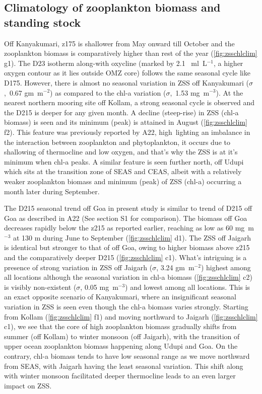 \documentclass[authoryear,review,12pt]{elsarticle}
\begin{document}
	\subsection{Climatology of zooplankton biomass and standing stock}
	\label{sec:climatology}
	Off Kanyakumari, z175 is shallower from May onward till October and the zooplankton biomass is comparatively higher than rest of the year (\cref{fig:zsschlclim} g1). The D23 isotherm along-with oxycline (marked by 2.1 ~ml~L$^{-1}$, a higher oxygen contour as it lies outside OMZ core) follows the same seasonal cycle like D175. However, there is almost no seasonal variation in ZSS off Kanyakumari ($\sigma$,~0.67 gm~m$^{-2}$) as compared to the chl-a variation ($\sigma$,~1.53 mg~m$^{-3}$). At the nearest northern mooring site off Kollam, a strong seasonal cycle is observed and the D215 is deeper for any given month. A decline (steep-rise) in ZSS (chl-a  biomass) is seen and its minimum (peak) is attained in August (\cref{fig:zsschlclim} f2). This feature was previously reported by A22, high~lighting an imbalance in the interaction between zooplankton and phytoplankton, it occurs due to shallowing of thermocline and low oxygen, and that's why the ZSS is at it's minimum when chl-a peaks. A similar feature is seen further north, off Udupi which sits at the transition zone of SEAS and CEAS, albeit with a relatively weaker zooplankton biomass and minimum (peak) of ZSS (chl-a) occurring a month later during September.
	
	The D215 seasonal trend off Goa in present study is similar to trend of D215 off Goa as described in A22 (See section S1 for comparison). The biomass off Goa decreases rapidly below the z215 as reported earlier, reaching as low as 60 mg~m$^{-3}$ at 130 m during June to September (\cref{fig:zsschlclim} d1). The ZSS off Jaigarh is identical but stronger to that of off Goa, owing to higher biomass above z215 and the comparatively deeper D215 (\cref{fig:zsschlclim} c1). What's intriguing is a presence of strong variation in ZSS off Jaigarh ($\sigma$, 3.24 gm~m$^{-2}$) highest among all locations although the seasonal variation in chl-a biomass (\cref{fig:zsschlclim} c2) is visibly non-existent ($\sigma$, 0.05 mg~m$^{-3}$) and lowest among all locations. This is an exact opposite scenario of Kanyakumari, where an insignificant seasonal variation in ZSS is seen even though the chl-a biomass varies strongly. Starting from Kollam (\cref{fig:zsschlclim} f1) and moving northward to Jaigarh (\cref{fig:zsschlclim} c1), we see that the core of high zooplankton biomass gradually shifts from summer (off Kollam) to winter monsoon (off Jaigarh), with the transition of upper ocean zooplankton biomass happening along Udupi and Goa. On the contrary, chl-a biomass tends to have low seasonal range as we move northward from SEAS, with Jaigarh having the least seasonal variation. This shift along with winter monsoon facilitated deeper thermocline leads to an even larger impact on ZSS.
	
\end{document}
